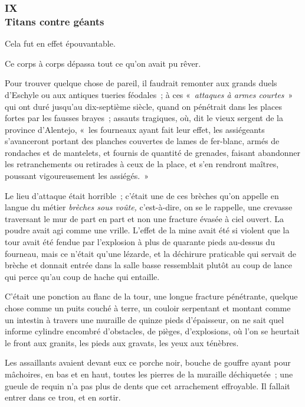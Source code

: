 \documentclass[french,twoside]{book} %
\begin{document}
 \subsubsection[{IX. Titans contre géants}]{IX \\
Titans contre géants}
\label{p3l4c9}
\noindent Cela fut en effet épouvantable.\par
Ce corps à corps dépassa tout ce qu’on avait pu rêver.\par
Pour trouver quelque chose de pareil, il faudrait remonter aux grands duels d’Eschyle ou aux antiques tueries féodales ; à ces « \emph{attaques à armes courtes} » qui ont duré jusqu’au dix-septième siècle, quand on pénétrait dans les places fortes par les fausses brayes ; assauts tragiques, où, dit le vieux sergent de la province d’Alentejo, « les fourneaux ayant fait leur effet, les assiégeants s’avanceront portant des planches couvertes de lames de fer-blanc, armés de rondaches et de mantelets, et fournis de quantité de grenades, faisant abandonner les retranchements ou retirades à ceux de la place, et s’en rendront maîtres, poussant vigoureusement les assiégés. »\par
Le lieu d’attaque était horrible ; c’était une de ces brèches qu’on appelle en langue du métier \emph{brèches sous voûte,} c’est-à-dire, on se le rappelle, une crevasse traversant le mur de part en part et non une fracture évasée à ciel ouvert. La poudre avait agi comme une  vrille. L’effet de la mine avait été si violent que la tour avait été fendue par l’explosion à plus de quarante pieds au-dessus du fourneau, mais ce n’était qu’une lézarde, et la déchirure praticable qui servait de brèche et donnait entrée dans la salle basse ressemblait plutôt au coup de lance qui perce qu’au coup de hache qui entaille.\par
C’était une ponction au flanc de la tour, une longue fracture pénétrante, quelque chose comme un puits couché à terre, un couloir serpentant et montant comme un intestin à travers une muraille de quinze pieds d’épaisseur, on ne sait quel informe cylindre encombré d’obstacles, de pièges, d’explosions, où l’on se heurtait le front aux granits, les pieds aux gravats, les yeux aux ténèbres.\par
Les assaillants avaient devant eux ce porche noir, bouche de gouffre ayant pour mâchoires, en bas et en haut, toutes les pierres de la muraille déchiquetée ; une gueule de requin n’a pas plus de dents que cet arrachement effroyable. Il fallait entrer dans ce trou, et en sortir.\par
\end{document}
